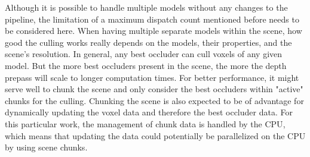 \noindent
Although it is possible to handle multiple models without any changes to the pipeline, the limitation of a maximum 
dispatch count mentioned before needs to be considered here. When having multiple separate models within the scene, 
how good the culling works really depends on the models, their properties, and the scene's resolution. In general, 
any best occluder can cull voxels of any given model. But the more best occluders present in the scene, the more 
the depth prepass will scale to longer computation times. For better performance, it might serve well to chunk the 
scene and only consider the best occluders within "active" chunks for the culling. Chunking the scene is also 
expected to be of advantage for dynamically updating the voxel data and therefore the best occluder data. For this 
particular work, the management of chunk data is handled by the \ac{CPU}, which means that updating the data could 
potentially be parallelized on the \ac{CPU} by using scene chunks. \\
 